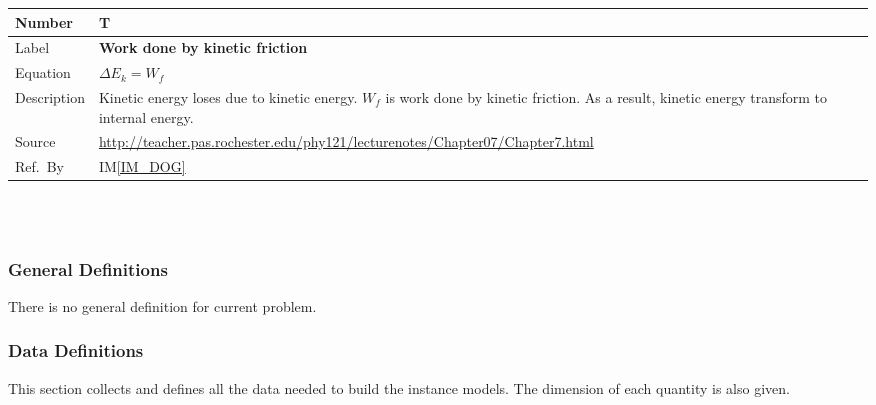 \documentclass[12pt]{article}
\newcommand{\colAwidth}{0.13\textwidth}
\newcommand{\colBwidth}{0.82\textwidth}
\newcounter{theorynum} %
\newcommand{\iref}[1]{IM\ref{#1}}
\begin{document}
	\noindent
	\begin{minipage}{\textwidth}
		\renewcommand*{\arraystretch}{1.5}
		\begin{tabular}{| p{\colAwidth} | p{\colBwidth}|}
			\hline
			\rowcolor[gray]{0.9}
			Number& T{theorynum}\thetheorynum \label{T_WKF}\\
			\hline
			Label&\bf Work done by kinetic friction\\
			\hline
			Equation&  $\Delta E_{k}=W_{f}$\\
			\hline
			
			Description & 
			Kinetic energy loses due to kinetic energy. $W_{f}$ is work done by kinetic friction. As a result, kinetic energy transform to internal energy.\\
			\hline
			Source &
			\url{http://teacher.pas.rochester.edu/phy121/lecturenotes/Chapter07/Chapter7.html}\\
			\hline
			Ref.\ By & \iref{IM_DOG}\\
			\hline
		\end{tabular}
	\end{minipage}\\
	
	~\newline
	
	\subsubsection{General Definitions}\label{sec_gendef}
	
	There is no general definition for current problem.
	
	\subsubsection{Data Definitions}\label{sec_datadef}
	
	This section collects and defines all the data needed to build the instance
	models. The dimension of each quantity is also given. 
	
	~\newline
	
\end{document}
